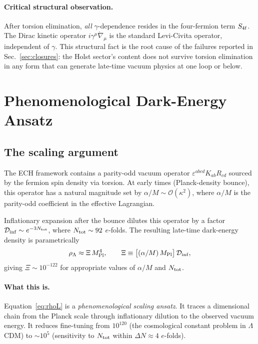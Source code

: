 \documentclass[aps,prd,twocolumn,superscriptaddress,showpacs,preprintnumbers,
  nofootinbib,longbibliography,floatfix]{revtex4-2}
\newcommand{\Dinf}{\mathcal{D}_{\rm inf}}
\newcommand{\MPl}{M_{\rm Pl}}
\newcommand{\BI}{\gamma}
\begin{document}
\paragraph{Critical structural observation.}
After torsion elimination, \textit{all} $\BI$-dependence resides in the
four-fermion term $S_{\rm 4f}$. The Dirac kinetic operator
$i\gamma^\mu\mathring\nabla_\mu$ is the standard Levi-Civita operator,
independent of $\BI$. This structural fact is the root cause of the
failures reported in Sec.~\ref{sec:closures}: the Holst sector's content
does not survive torsion elimination in any form that can generate
late-time vacuum physics at one loop or below.


\section{Phenomenological Dark-Energy Ansatz}\label{sec:ansatz}

\subsection{The scaling argument}\label{sec:scaling}

The ECH framework contains a parity-odd vacuum operator
$\varepsilon^{abcd}K_{ab}R_{cd}$ sourced by the fermion spin density via
torsion. At early times (Planck-density bounce), this operator has a
natural magnitude set by $\alpha/M \sim \mathcal{O}(\kappa^2)$, where
$\alpha/M$ is the parity-odd coefficient in the effective Lagrangian.

Inflationary expansion after the bounce dilutes this operator by a factor
$\Dinf \sim e^{-3N_{\rm tot}}$, where $N_{\rm tot} \sim 92$ $e$-folds.
The resulting late-time dark-energy density is parametrically
\begin{equation}\label{eq:rhoL}
  \rho_\Lambda \approx \Xi\,\MPl^4, \qquad
  \Xi \equiv \bigl[(\alpha/M)\,\MPl\bigr]\,\Dinf,
\end{equation}
giving $\Xi \sim 10^{-122}$ for appropriate values of $\alpha/M$ and
$N_{\rm tot}$.

\paragraph{What this is.}
Equation~\eqref{eq:rhoL} is a \textit{phenomenological scaling ansatz}.
It traces a dimensional chain from the Planck scale through inflationary
dilution to the observed vacuum energy. It reduces fine-tuning from
$10^{120}$ (the cosmological constant problem in $\Lambda$CDM) to
$\sim\!10^5$ (sensitivity to $N_{\rm tot}$ within $\Delta N \approx 4$
$e$-folds).
\end{document}
